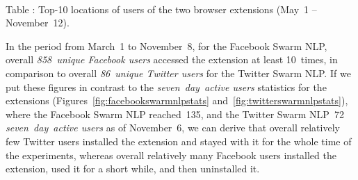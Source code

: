 \documentclass{iosart2c}
\begin{document}
\begin{table}
  \centering
  \qquad
  \\[1em]
  \addtocounter{table}{1}
  Table : Top-10 locations of users of the two browser extensions (May~1 -- November~12).
\end{table}

In the period from March~1 to November~8, for the Facebook Swarm NLP, overall \emph{858~unique Facebook users} accessed the extension at least 10~times, in comparison to overall \emph{86~unique Twitter users} for the Twitter Swarm NLP.
If we put these figures in contrast to the \emph{seven~day~active users} statistics for the extensions (Figures~\ref{fig:facebookswarmnlpstats} and~\ref{fig:twitterswarmnlpstats}), where the Facebook Swarm NLP reached~135, and the Twitter Swarm NLP~72 \emph{seven~day~active users} as of November~6, we can derive that overall relatively few Twitter users installed the extension and stayed with it for the whole time of the experiments, whereas overall relatively many Facebook users installed the extension, used it for a short while, and then uninstalled it.
\end{document}
